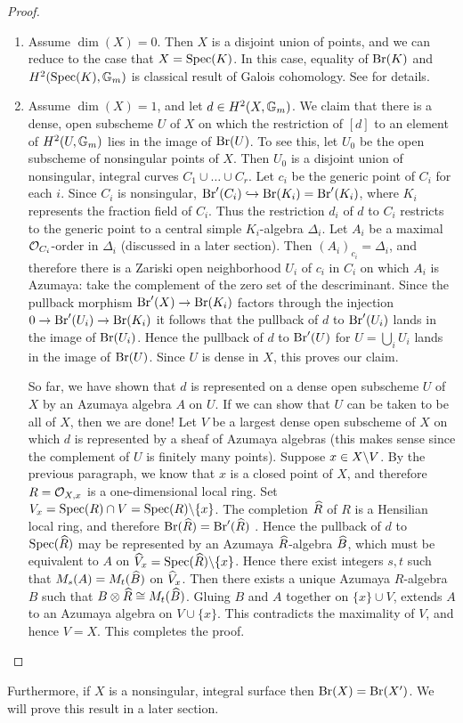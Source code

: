 \begin{proof}
\begin{enumerate}
\item  Assume $\dim(X) = 0$.  Then $X$ is a disjoint union of points, and we can reduce to the case that $X = \textnormal{Spec}(K)$.  In this case, equality of $\textnormal{Br}(K)$ and $H^2(\textnormal{Spec}(K),\mathbb{G}_m)$ is classical result of Galois cohomology.  See \cite{gille2006central} for details.
\item
Assume $\dim(X) = 1$, and let $d\in H^2(X,\mathbb{G}_m)$.  We claim that there is a dense, open subscheme $U$ of $X$ on which the restriction of $[d]$ to an element of $H^2(U,\mathbb{G}_m)$ lies in the image of $\textnormal{Br}(U)$.  To see this, let $U_0$ be the open subscheme of nonsingular points of $X$.  Then $U_0$ is a disjoint union of nonsingular, integral curves $C_1\cup\dots\cup C_r$.  Let $c_i$ be the generic point of $C_i$ for each $i$.  Since $C_i$ is nonsingular, $\textnormal{Br}'(C_i)\hookrightarrow \textnormal{Br}(K_i)=\textnormal{Br}'(K_i)$, where $K_i$ represents the fraction field of $C_i$.  Thus the restriction $d_i$ of $d$ to $C_i$ restricts to the generic point to a central simple $K_i$-algebra $\Delta_i$.  Let $A_i$ be a maximal $\mathcal{O}_{C_i}$-order in $\Delta_i$ (discussed in a later section).  Then $(A_i)_{c_i} = \Delta_i$, and therefore there is a Zariski open neighborhood $U_i$ of $c_i$ in $C_i$ on which $A_i$ is Azumaya: take the complement of the zero set of the descriminant.  Since the pullback morphism $\textnormal{Br}'(X)\rightarrow\textnormal{Br}(K_i)$ factors through the injection $0\rightarrow \textnormal{Br}'(U_i)\rightarrow\textnormal{Br}(K_i)$ it follows that the pullback of $d$ to $\textnormal{Br}'(U_i)$ lands in the image of $\textnormal{Br}(U_i)$.  Hence the pullback of $d$ to $\textnormal{Br}'(U)$ for $U=\bigcup_i U_i$ lands in the image of $\textnormal{Br}(U)$.  Since $U$ is dense in $X$, this proves our claim.

So far, we have shown that $d$ is represented on a dense open subscheme $U$ of $X$ by an Azumaya algebra $A$ on $U$.  If we can show that $U$ can be taken to be all of $X$, then we are done!  Let $V$ be a largest dense open subscheme of $X$ on which $d$ is represented by a sheaf of Azumaya algebras (this makes sense since the complement of $U$ is finitely many points).  Suppose $x\in X\backslash V$.  By the previous paragraph, we know that $x$ is a closed point of $X$, and therefore $R = \mathcal{O}_{X,x}$ is a one-dimensional local ring.  Set $V_x = \textnormal{Spec}(R)\cap V = \textnormal{Spec}(R)\backslash\{x\}$.  The completion $\widehat R$ of $R$ is a Hensilian local ring, and therefore $\textnormal{Br}(\widehat R) = \textnormal{Br}'(\widehat R)$ \cite{milne1980etale}.  Hence the pullback of $d$ to $\textnormal{Spec}(\widehat R)$ may be represented by an Azumaya $\widehat R$-algebra $\widehat B$, which must be equivalent to $A$ on $\widehat V_x = \textnormal{Spec}(\widehat R)\backslash \{x\}$.  Hence there exist integers $s,t$ such that $M_s(A) = M_t(\widehat B)$ on $\widehat V_x$.  Then there exists a unique Azumaya $R$-algebra $B$ such that $B\otimes\widehat R \cong M_t(\widehat B)$.  Gluing $B$ and $A$ together on $\{x\}\cup V$, extends $A$ to an Azumaya algebra on $V\cup \{x\}$.  This contradicts the maximality of $V$, and hence $V = X$.  This completes the proof.
\end{enumerate}
\end{proof}

Furthermore, if $X$ is a nonsingular, integral surface then $\textnormal{Br}(X) = \textnormal{Br}(X')$.  We will prove this result in a later section.



